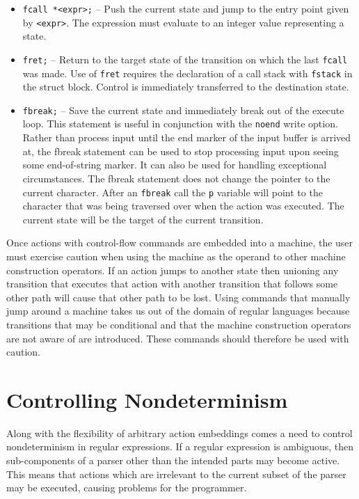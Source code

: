 \documentclass[letterpaper,11pt,oneside]{book}
\begin{document}
\begin{itemize}
\item \verb|fcall *<expr>;| -- Push the current state and jump to the entry
point given by \verb|<expr>|. The expression must evaluate to an integer value
representing a state.

\item \verb|fret;| -- Return to the target state of the transition on which the
last \verb|fcall| was made.  Use of \verb|fret| requires the declaration of a
call stack with \verb|fstack| in the struct block.  Control is immediately
transferred to the destination state.

\item \verb|fbreak;| -- Save the current state and immediately break out of the
execute loop. This statement is useful in conjunction with the \verb|noend|
write option. Rather than process input until the end marker of the input
buffer is arrived at, the fbreak statement can be used to stop processing input
upon seeing some end-of-string marker.  It can also be used for handling
exceptional circumstances.  The fbreak statement does not change the pointer to
the current character. After an \verb|fbreak| call the \verb|p| variable will point to
the character that was being traversed over when the action was
executed. The current state will be the target of the current transition.

\end{itemize}

 Once actions with control-flow commands are embedded into a
machine, the user must exercise caution when using the machine as the operand
to other machine construction operators. If an action jumps to another state
then unioning any transition that executes that action with another transition
that follows some other path will cause that other path to be lost. Using
commands that manually jump around a machine takes us out of the domain of
regular languages because transitions that may be conditional and that the
machine construction operators are not aware of are introduced.  These
commands should therefore be used with caution.


\chapter{Controlling Nondeterminism}
\label{controlling-nondeterminism}

Along with the flexibility of arbitrary action embeddings comes a need to
control nondeterminism in regular expressions. If a regular expression is
ambiguous, then sub-components of a parser other than the intended parts may become
active. This means that actions which are irrelevant to the
current subset of the parser may be executed, causing problems for the
programmer.
\end{document}
